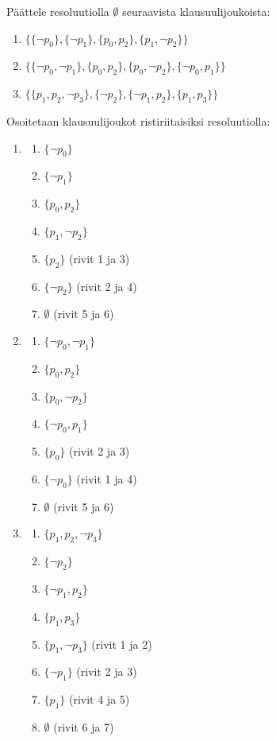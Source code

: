 \documentclass[11pt,a4paper]{amsart}
\begin{document}
\begin{exercise}
Päättele resoluutiolla \(\emptyset\) seuraavista klausuulijoukoista:
\begin{enumerate}[label=\alph*), nosep]
\item \(\{\{\neg p_0\}, \{\neg p_1\}, \{p_0, p_2\}, \{p_1, \neg p_2\}\}\)
\item \(\{\{\neg p_0, \neg p_1\}, \{p_0, p_2\}, \{p_0, \neg p_2\},
\{\neg p_0, p_1\}\}\)
\item \(\{\{p_1, p_2, \neg p_3\}, \{\neg p_2\}, \{\neg p_1, p_2\},
\{p_1, p_3\}\}\)
\end{enumerate}
\end{exercise}

\begin{solution}
Osoitetaan klausuulijoukot ristiriitaisiksi resoluutiolla:
\begin{enumerate}[label=\alph*)]
\item
\begin{enumerate}[label=\arabic*., nosep]
\item \(\{\neg p_0\}\)
\item \(\{\neg p_1\}\)
\item \(\{p_0,p_2\}\)
\item \(\{p_1,\neg p_2\}\)
\item \(\{p_2\}\) (rivit 1 ja 3)
\item \(\{\neg p_2\}\) (rivit 2 ja 4)
\item \(\emptyset\) (rivit 5 ja 6)
\end{enumerate}

\item
\begin{enumerate}[label=\arabic*., nosep]
\item \(\{\neg p_0,\neg p_1\}\)
\item \(\{p_0,p_2\}\)
\item \(\{p_0,\neg p_2\}\)
\item \(\{\neg p_0,p_1\}\)
\item \(\{p_0\}\) (rivit 2 ja 3)
\item \(\{\neg p_0\}\) (rivit 1 ja 4)
\item \(\emptyset\) (rivit 5 ja 6)
\end{enumerate}

\item
\begin{enumerate}[label=\arabic*., nosep]
\item \(\{p_1,p_2,\neg p_3\}\)
\item \(\{\neg p_2\}\)
\item \(\{\neg p_1,p_2\}\)
\item \(\{p_1,p_3\}\)
\item \(\{p_1,\neg p_3\}\) (rivit 1 ja 2)
\item \(\{\neg p_1\}\) (rivit 2 ja 3)
\item \(\{p_1\}\) (rivit 4 ja 5)
\item \(\emptyset\) (rivit 6 ja 7)
\end{enumerate}
\end{enumerate}
\end{solution}
\end{document}
